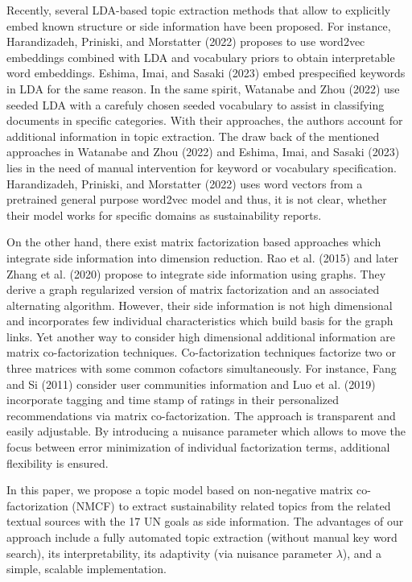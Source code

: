 \documentclass[
]{article}
\begin{document}
Recently, several LDA-based topic extraction methods that allow to explicitly embed known structure or side information have been proposed. For instance, Harandizadeh, Priniski, and Morstatter (2022) proposes to use word2vec embeddings combined with LDA and vocabulary priors to obtain interpretable word embeddings. Eshima, Imai, and Sasaki (2023) embed prespecified keywords in LDA for the same reason. In the same spirit, Watanabe and Zhou (2022) use seeded LDA with a carefuly chosen seeded vocabulary to assist in classifying documents in specific categories. With their approaches, the authors account for additional information in topic extraction. The draw back of the mentioned approaches in Watanabe and Zhou (2022) and Eshima, Imai, and Sasaki (2023) lies in the need of manual intervention for keyword or vocabulary specification. Harandizadeh, Priniski, and Morstatter (2022) uses word vectors from a pretrained general purpose word2vec model and thus, it is not clear, whether their model works for specific domains as sustainability reports.

On the other hand, there exist matrix factorization based approaches which integrate side information into dimension reduction. Rao et al. (2015) and later Zhang et al. (2020) propose to integrate side information using graphs. They derive a graph regularized version of matrix factorization and an associated alternating algorithm. However, their side information is not high dimensional and incorporates few individual characteristics which build basis for the graph links. Yet another way to consider high dimensional additional information are matrix co-factorization techniques.
Co-factorization techniques factorize two or three matrices with some common cofactors simultaneously. For instance, Fang and Si (2011) consider user communities information and Luo et al. (2019) incorporate tagging and time stamp of ratings in their personalized recommendations via matrix co-factorization. The approach is transparent and easily adjustable. By introducing a nuisance parameter which allows to move the focus between error minimization of individual factorization terms, additional flexibility is ensured.

In this paper, we propose a topic model based on non-negative matrix co-factorization (NMCF) to extract sustainability related topics from the related textual sources with the 17 UN goals as side information. The advantages of our approach include a fully automated topic extraction (without manual key word search), its interpretability, its adaptivity (via nuisance parameter \(\lambda\)), and a simple, scalable implementation.
\end{document}

